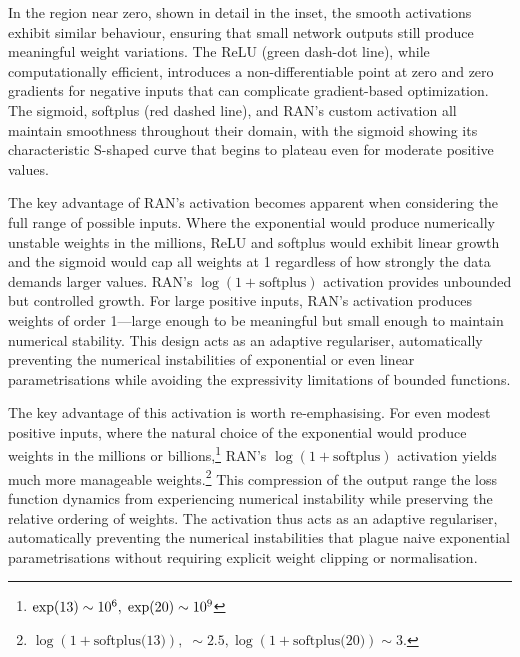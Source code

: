 {{In the region near zero, shown in detail in the inset, the smooth activations exhibit similar behaviour, ensuring that small network outputs still produce meaningful weight variations. The ReLU (green dash-dot line), while computationally efficient, introduces a non-differentiable point at zero and zero gradients for negative inputs that can complicate gradient-based optimization. The sigmoid, softplus (red dashed line), and RAN's custom activation all maintain smoothness throughout their domain, with the sigmoid showing its characteristic S-shaped curve that begins to plateau even for moderate positive values.

The key advantage of RAN's activation becomes apparent when considering the full range of possible inputs. Where the exponential would produce numerically unstable weights in the millions, ReLU and softplus would exhibit linear growth and the sigmoid would cap all weights at 1 regardless of how strongly the data demands larger values. RAN's $\log(1 + \text{softplus})$ activation provides unbounded but controlled growth. For large positive inputs, RAN's activation produces weights of order 1---large enough to be meaningful but small enough to maintain numerical stability.
%
This design acts as an adaptive regulariser, automatically preventing the numerical instabilities of exponential or even linear parametrisations while avoiding the expressivity limitations of bounded functions.

            The key advantage of this activation is worth re-emphasising.
            For even modest positive inputs, where the natural choice of the exponential would produce weights in the millions or billions,\footnote{\(\exp(13)\sim\num{d6},\; \exp(20)\sim\num{d9}\)} RAN's $\log(1 + \text{softplus})$ activation yields much more manageable weights.\footnote{\(\log(1 + \text{softplus(13)}),\;\sim 2.5, \log(1 + \text{softplus(20)})\sim 3\).} This compression of the output range the loss function dynamics from experiencing numerical instability while preserving the relative ordering of weights. The activation thus acts as an adaptive regulariser, automatically preventing the numerical instabilities that plague naive exponential parametrisations without requiring explicit weight clipping or normalisation.
            


}}
